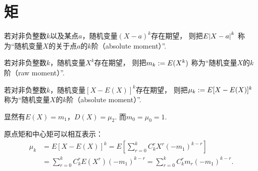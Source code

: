 \section{矩}
\begin{definition}
若对非负整数\(k\)以及某点\(a\)，随机变量\((X-a)^k\)存在期望，
则把\(E\abs{X-a}^k\)
称为“随机变量\(X\)的关于点\(a\)的\(k\)阶（absolute moment）”.
\end{definition}

\begin{definition}
若对非负整数\(k\)，随机变量\(X^k\)存在期望，
则把\(m_k := E(X^k)\)
称为“随机变量\(X\)的\(k\)阶（raw moment）”.
\end{definition}

\begin{definition}
若对非负整数\(k\)，随机变量\([X-E(X)]^k\)存在期望，
则把\(\mu_k := E[X-E(X)]^k\)
称为“随机变量\(X\)的\(k\)阶（absolute moment）”.
\end{definition}

显然有\(E(X) = m_1\)，\(D(X) = \mu_2\).
而\(m_0 = \mu_0 = 1\).

原点矩和中心矩可以相互表示：
\begin{align*}
	\mu_k &= E[X-E(X)]^k
	= E\left[ \sum_{r=0}^k{C_k^r X^r (-m_1)^{k-r}} \right] \\
	&= \sum_{r=0}^k{C_k^r E(X^r) (-m_1)^{k-r}}
	= \sum_{r=0}^k{C_k^r m_r (-m_1)^{k-r}}.
\end{align*}
